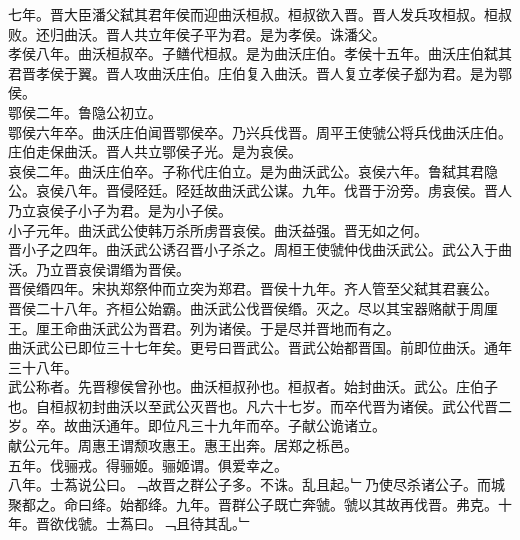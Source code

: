 \documentclass{zhvt-classic}
\begin{document}
\hspace*{2em}七年。晋大臣潘父弑其君年侯而迎曲沃桓叔。桓叔欲入晋。晋人发兵攻桓叔。桓叔败。还归曲沃。晋人共立年侯子平为君。是为孝侯。诛潘父。\\
\hspace*{2em}孝侯八年。曲沃桓叔卒。子鳝代桓叔。是为曲沃庄伯。孝侯十五年。曲沃庄伯弑其君晋孝侯于翼。晋人攻曲沃庄伯。庄伯复入曲沃。晋人复立孝侯子郄为君。是为鄂侯。\\
\hspace*{2em}鄂侯二年。鲁隐公初立。\\
\hspace*{2em}鄂侯六年卒。曲沃庄伯闻晋鄂侯卒。乃兴兵伐晋。周平王使虢公将兵伐曲沃庄伯。庄伯走保曲沃。晋人共立鄂侯子光。是为哀侯。\\
\hspace*{2em}哀侯二年。曲沃庄伯卒。子称代庄伯立。是为曲沃武公。哀侯六年。鲁弑其君隐公。哀侯八年。晋侵陉廷。陉廷故曲沃武公谋。九年。伐晋于汾旁。虏哀侯。晋人乃立哀侯子小子为君。是为小子侯。\\
\hspace*{2em}小子元年。曲沃武公使韩万杀所虏晋哀侯。曲沃益强。晋无如之何。\\
\hspace*{2em}晋小子之四年。曲沃武公诱召晋小子杀之。周桓王使虢仲伐曲沃武公。武公入于曲沃。乃立晋哀侯谓缗为晋侯。\\
\hspace*{2em}晋侯缗四年。宋执郑祭仲而立突为郑君。晋侯十九年。齐人管至父弑其君襄公。\\
\hspace*{2em}晋侯二十八年。齐桓公始霸。曲沃武公伐晋侯缗。灭之。尽以其宝器赂献于周厘王。厘王命曲沃武公为晋君。列为诸侯。于是尽并晋地而有之。\\
\hspace*{2em}曲沃武公已即位三十七年矣。更号曰晋武公。晋武公始都晋国。前即位曲沃。通年三十八年。\\
\hspace*{2em}武公称者。先晋穆侯曾孙也。曲沃桓叔孙也。桓叔者。始封曲沃。武公。庄伯子也。自桓叔初封曲沃以至武公灭晋也。凡六十七岁。而卒代晋为诸侯。武公代晋二岁。卒。故曲沃通年。即位凡三十九年而卒。子献公诡诸立。\\
\hspace*{2em}献公元年。周惠王谓颓攻惠王。惠王出奔。居郑之栎邑。\\
\hspace*{2em}五年。伐骊戎。得骊姬。骊姬谓。俱爱幸之。\\
\hspace*{2em}八年。士蒍说公曰。﹁故晋之群公子多。不诛。乱且起。﹂乃使尽杀诸公子。而城聚都之。命曰绛。始都绛。九年。晋群公子既亡奔虢。虢以其故再伐晋。弗克。十年。晋欲伐虢。士蒍曰。﹁且待其乱。﹂\\
\end{document}
